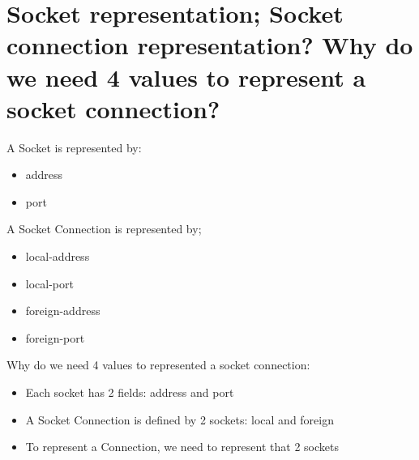 \documentclass[11pt,a4paper]{report}
\begin{document}
  	\section{Socket representation; Socket connection representation? Why do we need 4 values to represent a socket connection?}
  	A Socket is represented by:
  	\begin{itemize}
  		\item address
  		\item port
  	\end{itemize}
  	A Socket Connection is represented by;
  	\begin{itemize}
  		\item local-address
  		\item local-port
  		\item foreign-address
  		\item foreign-port
  	\end{itemize}
  	Why do we need 4 values to represented a socket connection:
  	\begin{itemize}
  		\item Each socket has 2 fields: address and port
  		\item A Socket Connection is defined by 2 sockets: local and foreign
  		\item To represent a Connection, we need to represent that 2 sockets
  	\end{itemize}
  	
\end{document}
